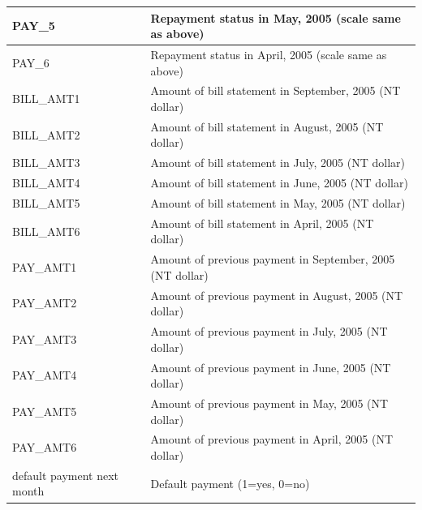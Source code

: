 \begin{table}
{\begin{tabular}{|l|l|}
PAY\_5                     &            Repayment status in May, 2005 (scale same as above)          \\ \hline
PAY\_6                     &           Repayment status in April, 2005 (scale same as above)           \\ \hline
BILL\_AMT1                 &           Amount of bill statement in September, 2005 (NT dollar)           \\ \hline
BILL\_AMT2                 &            Amount of bill statement in August, 2005 (NT dollar)          \\ \hline
BILL\_AMT3                 &              Amount of bill statement in July, 2005 (NT dollar)        \\ \hline
BILL\_AMT4                 &            Amount of bill statement in June, 2005 (NT dollar)          \\ \hline
BILL\_AMT5                 &           Amount of bill statement in May, 2005 (NT dollar)           \\ \hline
BILL\_AMT6                 &           Amount of bill statement in April, 2005 (NT dollar)           \\ \hline
PAY\_AMT1                  &               Amount of previous payment in September, 2005 (NT dollar)       \\ \hline
PAY\_AMT2                  &          Amount of previous payment in August, 2005 (NT dollar)            \\ \hline
PAY\_AMT3                  &              Amount of previous payment in July, 2005 (NT dollar)        \\ \hline
PAY\_AMT4                  &              Amount of previous payment in June, 2005 (NT dollar)        \\ \hline
PAY\_AMT5                  &              Amount of previous payment in May, 2005 (NT dollar)        \\ \hline
PAY\_AMT6                  &           Amount of previous payment in April, 2005 (NT dollar)           \\ \hline
default payment next month &             Default payment (1=yes, 0=no)         \\ \hline
\end{tabular}}
\end{table}


\clearpage
